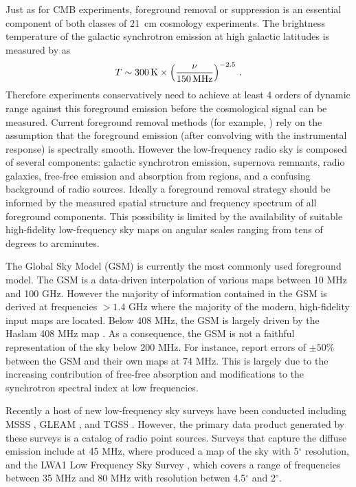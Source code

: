 \documentclass[twocolumn]{aastex61}
\begin{document}
Just as for CMB experiments, foreground removal or suppression is an essential component of both
classes of 21~cm cosmology experiments. The brightness temperature of the galactic synchrotron
emission at high galactic latitudes is measured by \citet{2008AJ....136..641R} as
\begin{equation}
    T \sim 300\,{\rm K} \times \left(\frac{\nu}{150\,{\rm MHz}}\right)^{-2.5}\,.
\end{equation}
Therefore experiments conservatively need to achieve at least 4 orders of dynamic range against this
foreground emission before the cosmological signal can be measured. Current foreground removal
methods (for example, \citealt{2012ApJ...756..165P}) rely on the assumption that the foreground
emission (after convolving with the instrumental response) is spectrally smooth. However the
low-frequency radio sky is composed of several components: galactic synchrotron emission, supernova
remnants, radio galaxies, free-free emission and absorption from  regions, and a confusing
background of radio sources.  Ideally a foreground removal strategy should be informed by the
measured spatial structure and frequency spectrum of all foreground components.  This possibility is
limited by the availability of suitable high-fidelity low-frequency sky maps on angular scales
ranging from tens of degrees to arcminutes.

The Global Sky Model (GSM) \citep{2008MNRAS.388..247D, 2017MNRAS.464.3486Z} is currently the most
commonly used foreground model. The GSM is a data-driven interpolation of various maps between 10
MHz and 100 GHz. However the majority of information contained in the GSM is derived at frequencies
$>1.4$ GHz where the majority of the modern, high-fidelity input maps are located.  Below 408 MHz,
the GSM is largely driven by the Haslam 408 MHz map \citep{1981A&A...100..209H, 1982A&AS...47....1H,
2015MNRAS.451.4311R}. As a consequence, the GSM is not a faithful representation of the sky below
200 MHz. For instance, \citet{2017MNRAS.469.4537D} report errors of $\pm 50\%$ between the GSM and
their own maps at 74 MHz. This is largely due to the increasing contribution of free-free absorption
and modifications to the synchrotron spectral index at low frequencies.

Recently a host of new low-frequency sky surveys have been conducted including MSSS
\citep{2015A&A...582A.123H}, GLEAM \citep{2015PASA...32...25W}, and TGSS
\citep{2017A&A...598A..78I}. However, the primary data product generated by these surveys is a
catalog of radio point sources. Surveys that capture the diffuse emission include at 45 MHz, where
\citet{2011A&A...525A.138G} produced a map of the sky with 5$^\circ$ resolution, and the LWA1 Low
Frequency Sky Survey \citep{2017MNRAS.469.4537D}, which covers a range of frequencies between 35 MHz
and 80 MHz with resolution betwen 4.5$^\circ$ and 2$^\circ$.
\end{document}
